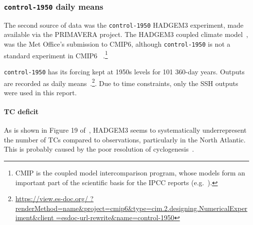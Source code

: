 \subsubsection{\texttt{control-1950} daily means}
\label{sec:control-1950-intro}

The second source of data was the \texttt{control-1950} HADGEM3 experiment,
made available via the PRIMAVERA project.
The HADGEM3 coupled climate model~\cite{williams2018met, FurtherInfo},
 was the Met Office's submission to CMIP6,
although \texttt{control-1950} is not a standard experiment in CMIP6~\cite{eyring2016overview}
.\footnote{CMIP is the coupled model intercomparison program,
whose models form an important part of the scientific basis for the IPCC
reports (e.g.~\cite{SROCC}).}

\texttt{control-1950} has its forcing kept at
1950s levels for 101 360-day years. Outputs are recorded as daily
means~\cite{williams2018met, FurtherInfo}.\footnote{\url{https://view.es-doc.org/
        ?renderMethod=name&project=cmip6&type=cim.2.designing.NumericalExperiment&client
        =esdoc-url-rewrite&name=control-1950}}.
Due to time constraints, only the SSH outputs were used in this report.

\paragraph{TC deficit} As is shown in Figure 19 of~\cite{williams2018met},
 HADGEM3 seems to systematically underrepresent
 the number of TCs compared to observations,
 particularly in the North Atlantic.
 This is probably caused by the poor resolution
 of cyclogenesis~\cite{tomassini2017interaction}.
